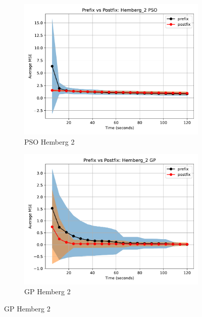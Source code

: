 \documentclass[runningheads]{llncs}
\begin{document}
\begin{figure}
    \vspace{0.5cm}
    
    \begin{subfigure}[b]{0.4\textwidth}
        \includegraphics[width=\linewidth, keepaspectratio]{Hemberg_Benchmarks/PrePostHemberg_2PSO.pdf}
        \caption{PSO Hemberg 2}
        \label{subfig:hemberg_2_PSO}
    \end{subfigure}
    \begin{subfigure}[b]{0.4\textwidth}
        \includegraphics[width=\linewidth, keepaspectratio]{Hemberg_Benchmarks/PrePostHemberg_2GP.pdf}
        \caption{GP Hemberg 2}
        \label{subfig:hemberg_2_GP}
    \end{subfigure}
    

\end{figure}
\end{document}
